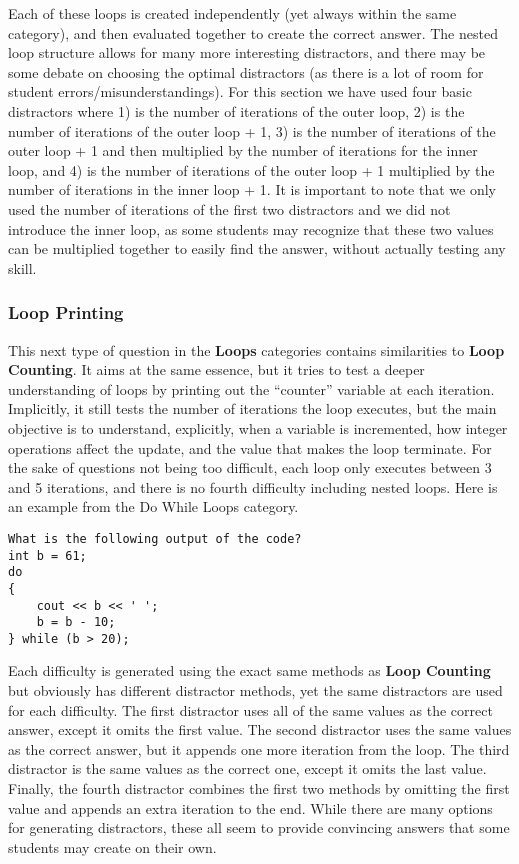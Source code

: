 \documentclass{article}
\begin{document}
Each of these loops is created independently (yet always within the same category), and then evaluated together to create the correct answer. The nested loop structure allows for many more
interesting distractors, and there may be some debate on choosing the optimal distractors (as there is a lot of room for student errors/misunderstandings). For this section we have used four
basic distractors where 1)  is the number of iterations of the outer loop, 2) is the number of iterations of the outer loop + 1, 3) is the number of iterations of the outer loop + 1 and then 
multiplied by the number of iterations for the inner loop, and 4) is the number of iterations of the outer loop + 1 multiplied by the number of iterations in the inner loop + 1. It is important to 
note that we only used the number of iterations of the first two distractors and we did not introduce the inner loop, as some students may recognize that these two values can be multiplied 
together to easily find the answer, without actually testing any skill.

\subsubsection{Loop Printing} \label{subsubsec-loop_printing}

This next type of question in the \textbf{Loops} categories contains similarities to \textbf{Loop Counting}. It aims at the same essence, but it tries to test a deeper understanding of loops by printing out the 
``counter'' variable at each iteration. Implicitly, it still tests the number of iterations the loop executes, but the main objective is to understand, explicitly, when a variable is incremented,
how integer operations affect the update, and the value that makes the loop terminate. For the sake of questions not being too difficult, each loop only executes between 3 and 5 iterations, and there is no fourth difficulty including nested loops. Here is an example from the Do While Loops category.

\begin{lstlisting}
What is the following output of the code? 
int b = 61; 
do
{ 
	cout << b << ' '; 
	b = b - 10; 
} while (b > 20); 
\end{lstlisting}


Each difficulty is generated using the exact same methods as \textbf{Loop Counting} but obviously has different distractor methods, yet the same distractors are used for each difficulty. The first 
distractor uses all of the same values as the correct answer, except it omits the first value. The second distractor uses the same values as the correct answer, but it appends one more iteration
from the loop. The third distractor is the same values as the correct one, except it omits the last value. Finally, the fourth distractor combines the first two methods by omitting the first value
and appends an extra iteration to the end. While there are many options for generating distractors, these all seem to provide convincing answers that some students may create on their own.
\end{document}
